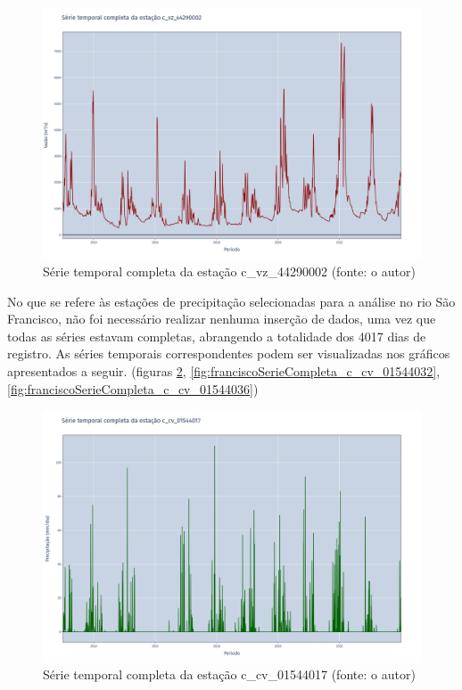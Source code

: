 \begin{figure}[!h]
\centering
\includegraphics[scale=0.25]{Figuras/rio_sao_francisco/franciscoSerieCompleta_c_vz_44290002.png}
\caption{Série temporal completa da estação c\_vz\_44290002 (fonte: o autor)}
\label{fig:franciscoSerieCompleta_c_vz_44290002}
\end{figure}
\clearpage

No que se refere às estações de precipitação selecionadas para a análise no rio São Francisco, não foi necessário realizar nenhuma inserção de dados, uma vez que todas as séries estavam completas, abrangendo a totalidade dos 4017 dias de registro. As séries temporais correspondentes podem ser visualizadas nos gráficos apresentados a seguir. (figuras \ref{fig:franciscoSerieCompleta_c_cv_01544017}, \ref{fig:franciscoSerieCompleta_c_cv_01544032}, \ref{fig:franciscoSerieCompleta_c_cv_01544036})

\begin{figure}[!h]
\centering
\includegraphics[scale=0.25]{Figuras/rio_sao_francisco/franciscoSerieCompleta_c_cv_01544017.png}
\caption{Série temporal completa da estação c\_cv\_01544017 (fonte: o autor)}
\label{fig:franciscoSerieCompleta_c_cv_01544017}
\end{figure}


